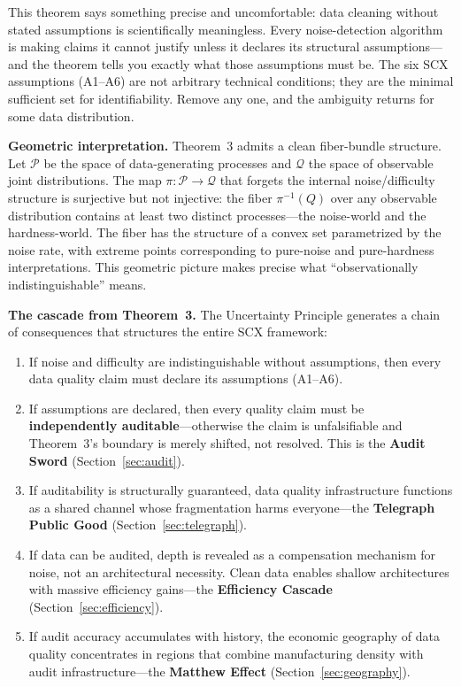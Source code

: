 \documentclass[twocolumn]{article}
\theoremstyle{definition}
\begin{document}
This theorem says something precise and uncomfortable: data cleaning without stated assumptions is scientifically meaningless. Every noise-detection algorithm is making claims it cannot justify unless it declares its structural assumptions---and the theorem tells you exactly what those assumptions must be. The six SCX assumptions (A1--A6) are not arbitrary technical conditions; they are the minimal sufficient set for identifiability. Remove any one, and the ambiguity returns for some data distribution.

\textbf{Geometric interpretation.} Theorem~3 admits a clean fiber-bundle structure. Let $\mathcal{P}$ be the space of data-generating processes and $\mathcal{Q}$ the space of observable joint distributions. The map $\pi: \mathcal{P} \to \mathcal{Q}$ that forgets the internal noise/difficulty structure is surjective but not injective: the fiber $\pi^{-1}(Q)$ over any observable distribution contains at least two distinct processes---the noise-world and the hardness-world. The fiber has the structure of a convex set parametrized by the noise rate, with extreme points corresponding to pure-noise and pure-hardness interpretations. This geometric picture makes precise what ``observationally indistinguishable'' means.

\textbf{The cascade from Theorem~3.} The Uncertainty Principle generates a chain of consequences that structures the entire SCX framework:
\begin{enumerate}[nosep,leftmargin=*,itemsep=1pt]
  \item If noise and difficulty are indistinguishable without assumptions, then every data quality claim must declare its assumptions (A1--A6).
  \item If assumptions are declared, then every quality claim must be \textbf{independently auditable}---otherwise the claim is unfalsifiable and Theorem~3's boundary is merely shifted, not resolved. This is the \textbf{Audit Sword} (Section~\ref{sec:audit}).
  \item If auditability is structurally guaranteed, data quality infrastructure functions as a shared channel whose fragmentation harms everyone---the \textbf{Telegraph Public Good} (Section~\ref{sec:telegraph}).
  \item If data can be audited, depth is revealed as a compensation mechanism for noise, not an architectural necessity. Clean data enables shallow architectures with massive efficiency gains---the \textbf{Efficiency Cascade} (Section~\ref{sec:efficiency}).
  \item If audit accuracy accumulates with history, the economic geography of data quality concentrates in regions that combine manufacturing density with audit infrastructure---the \textbf{Matthew Effect} (Section~\ref{sec:geography}).
\end{enumerate}
\end{document}
